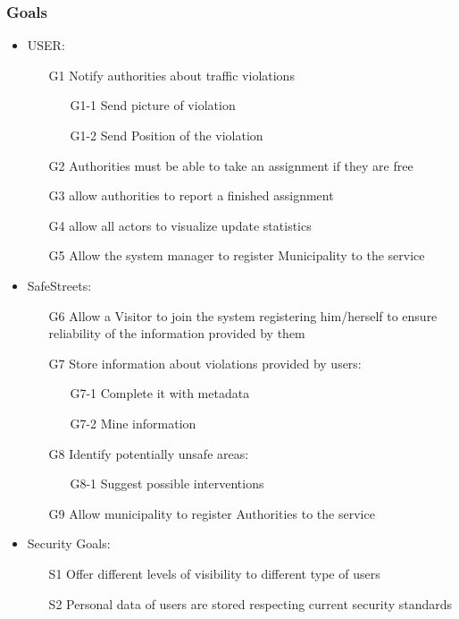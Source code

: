 \subsubsection{Goals}
\begin{itemize}
\item	USER:
\begin{itemize}
\item[G1] Notify authorities about traffic violations
\begin{itemize}
\item[G1-1] Send picture of violation
\item[G1-2] Send Position of the violation
\end{itemize}
\item[G2] Authorities must be able to take an assignment if they are free
\item[G3] allow authorities to report a finished assignment
\item[G4] allow all actors to visualize update statistics
\item[G5] Allow the system manager to register Municipality to the service
\end{itemize}
\item	SafeStreets:
\begin{itemize}
\item[G6] Allow a Visitor to join the system registering him/herself to ensure reliability of the information provided by them
\item[G7] Store information about violations provided by users:
\begin{itemize}
\item[G7-1] Complete it with metadata
\item[G7-2] Mine information
\end{itemize}
\item[G8] Identify potentially unsafe areas:
\begin{itemize}
\item[G8-1] Suggest possible interventions
\end{itemize}
\item[G9] Allow municipality to register Authorities to the service
\end{itemize}
\item	Security Goals:
\begin{itemize}
\item[S1] Offer different levels of visibility to different type of users
\item[S2] Personal data of users are stored respecting current security standards
\end{itemize}
\end{itemize}
